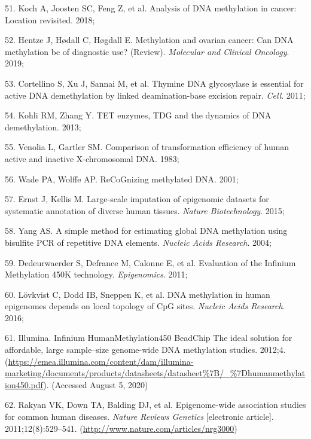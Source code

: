 \documentclass[11pt,oneside]{bristolthesis}
\newenvironment{cslreferences}%
  {}%
  {\par}
\begin{document}
\begin{cslreferences}
\leavevmode\hypertarget{ref-Koch2018}{}%
51. Koch A, Joosten SC, Feng Z, et al. Analysis of DNA methylation in cancer: Location revisited. 2018;

\leavevmode\hypertarget{ref-Hentze2019}{}%
52. Hentze J, Hødall C, Høgdall E. Methylation and ovarian cancer: Can DNA methylation be of diagnostic use? (Review). \emph{Molecular and Clinical Oncology}. 2019;

\leavevmode\hypertarget{ref-Cortellino2011}{}%
53. Cortellino S, Xu J, Sannai M, et al. Thymine DNA glycosylase is essential for active DNA demethylation by linked deamination-base excision repair. \emph{Cell}. 2011;

\leavevmode\hypertarget{ref-Kohli2013}{}%
54. Kohli RM, Zhang Y. TET enzymes, TDG and the dynamics of DNA demethylation. 2013;

\leavevmode\hypertarget{ref-Venolia1983}{}%
55. Venolia L, Gartler SM. Comparison of transformation efficiency of human active and inactive X-chromosomal DNA. 1983;

\leavevmode\hypertarget{ref-Wade2001}{}%
56. Wade PA, Wolffe AP. ReCoGnizing methylated DNA. 2001;

\leavevmode\hypertarget{ref-Ernst2015}{}%
57. Ernst J, Kellis M. Large-scale imputation of epigenomic datasets for systematic annotation of diverse human tissues. \emph{Nature Biotechnology}. 2015;

\leavevmode\hypertarget{ref-Yang2004}{}%
58. Yang AS. A simple method for estimating global DNA methylation using bisulfite PCR of repetitive DNA elements. \emph{Nucleic Acids Research}. 2004;

\leavevmode\hypertarget{ref-Dedeurwaerder2011}{}%
59. Dedeurwaerder S, Defrance M, Calonne E, et al. Evaluation of the Infinium Methylation 450K technology. \emph{Epigenomics}. 2011;

\leavevmode\hypertarget{ref-Lovkvist2016}{}%
60. Lövkvist C, Dodd IB, Sneppen K, et al. DNA methylation in human epigenomes depends on local topology of CpG sites. \emph{Nucleic Acids Research}. 2016;

\leavevmode\hypertarget{ref-Illumina2012}{}%
61. Illumina. Infinium HumanMethylation450 BeadChip The ideal solution for affordable, large sample--size genome-wide DNA methylation studies. 2012;4. (\url{https://emea.illumina.com/content/dam/illumina-marketing/documents/products/datasheets/datasheet\%7B/_\%7Dhumanmethylation450.pdf}). (Accessed August 5, 2020)

\leavevmode\hypertarget{ref-Rakyan2011}{}%
62. Rakyan VK, Down TA, Balding DJ, et al. Epigenome-wide association studies for common human diseases. \emph{Nature Reviews Genetics} {[}electronic article{]}. 2011;12(8):529--541. (\url{http://www.nature.com/articles/nrg3000})


\end{cslreferences}
\end{document}
